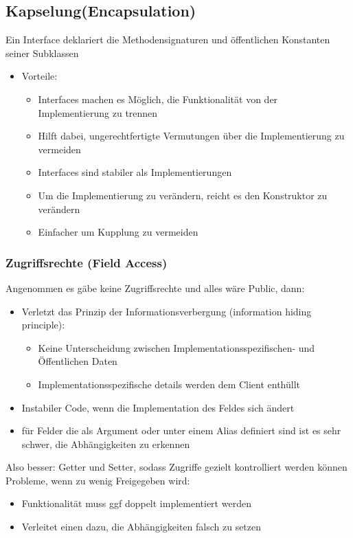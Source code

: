 \documentclass[
    ngerman,
    color=3b,
    summary,
    boxarc,
    main,
]{rubos-tuda-template}
\begin{document}
\subsection{Kapselung(Encapsulation)}
\begin{definition}
    Ein Interface deklariert die Methodensignaturen und öffentlichen Konstanten seiner Subklassen
\end{definition}
\begin{itemize}
    \item Vorteile:\begin{itemize}
              \item Interfaces machen es Möglich, die Funktionalität von der Implementierung zu trennen
              \item Hilft dabei, ungerechtfertigte Vermutungen über die Implementierung zu vermeiden
              \item Interfaces sind stabiler als Implementierungen
              \item Um die Implementierung zu verändern, reicht es den Konstruktor zu verändern
              \item Einfacher um Kupplung zu vermeiden
          \end{itemize}
\end{itemize}
\clearpage
\subsubsection{Zugriffsrechte (Field Access)}
Angenommen es gäbe keine Zugriffsrechte und alles wäre Public, dann:
\begin{itemize}
    \item Verletzt das Prinzip der Informationsverbergung (information hiding principle):\begin{itemize}
              \item Keine Unterscheidung zwischen Implementationsspezifischen- und Öffentlichen Daten
              \item Implementationsspezifische details werden dem Client enthüllt
          \end{itemize}
    \item Instabiler Code, wenn die Implementation des Feldes sich ändert
    \item für Felder die als Argument oder unter einem Alias definiert sind ist es sehr schwer, die Abhängigkeiten zu erkennen
\end{itemize}
Also besser: Getter und Setter, sodass Zugriffe gezielt kontrolliert werden können
Probleme, wenn zu wenig Freigegeben wird:\begin{itemize}
    \item Funktionalität muss ggf doppelt implementiert werden
    \item Verleitet einen dazu, die Abhängigkeiten falsch zu setzen
\end{itemize}
\end{document}
